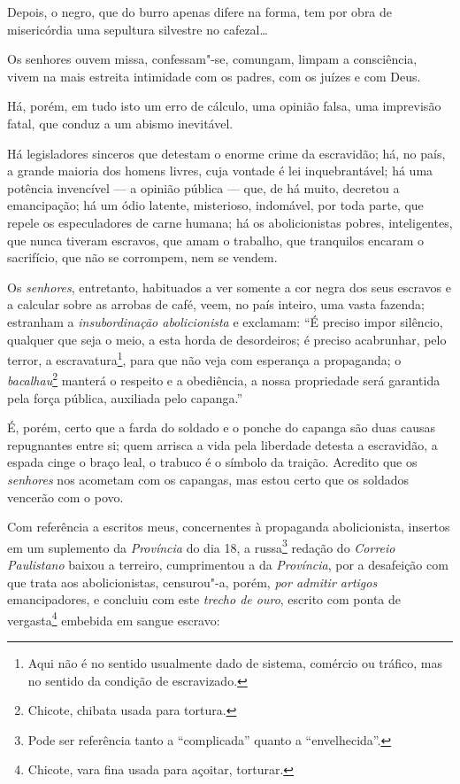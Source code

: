 Depois, o negro, que do burro apenas difere na forma, tem por obra de
misericórdia uma sepultura silvestre no cafezal\ldots{}

Os senhores ouvem missa, confessam"-se, comungam, limpam a consciência,
vivem na mais estreita intimidade com os padres, com os juízes e com
Deus.

Há, porém, em tudo isto um erro de cálculo, uma opinião falsa, uma
imprevisão fatal, que conduz a um abismo inevitável.

Há legisladores sinceros que detestam o enorme crime da escravidão; há,
no país, a grande maioria dos homens livres, cuja vontade é lei
inquebrantável; há uma potência invencível --- a opinião pública ---
que, de há muito, decretou a emancipação; há um ódio latente,
misterioso, indomável, por toda parte, que repele os especuladores de
carne humana; há os abolicionistas pobres, inteligentes, que nunca
tiveram escravos, que amam o trabalho, que tranquilos encaram o
sacrifício, que não se corrompem, nem se vendem.

Os \emph{senhores}, entretanto, habituados a ver somente a cor negra dos
seus escravos e a calcular sobre as arrobas de café, veem, no país
inteiro, uma vasta fazenda; estranham a \emph{insubordinação
abolicionista} e exclamam: ``É preciso impor silêncio, qualquer que seja
o meio, a esta horda de desordeiros; é preciso acabrunhar, pelo terror,
a escravatura\footnote{Aqui não é no sentido usualmente dado de
  sistema, comércio ou tráfico, mas no sentido da condição de
  escravizado.}, para que não veja com esperança a propaganda; o
\emph{bacalhau}\footnote{Chicote, chibata usada para tortura.} manterá
o respeito e a obediência, a nossa propriedade será garantida pela força
pública, auxiliada pelo capanga.''

É, porém, certo que a farda do soldado e o ponche do capanga são duas
causas repugnantes entre si; quem arrisca a vida pela liberdade detesta
a escravidão, a espada cinge o braço leal, o trabuco é o símbolo da
traição. Acredito que os \emph{senhores} nos acometam com os capangas,
mas estou certo que os soldados vencerão com o povo.

Com referência a escritos meus, concernentes à propaganda abolicionista,
insertos em um suplemento da \emph{Província} do dia 18, a
russa\footnote{Pode ser referência tanto a ``complicada'' quanto a
  ``envelhecida''.} redação do \emph{Correio Paulistano} baixou a terreiro,
cumprimentou a da \emph{Província}, por a desafeição com que trata aos
abolicionistas, censurou"-a, porém, \emph{por admitir artigos}
emancipadores, e concluiu com este \emph{trecho de ouro}, escrito com
ponta de vergasta\footnote{Chicote, vara fina usada para açoitar,
  torturar.} embebida em sangue escravo:

